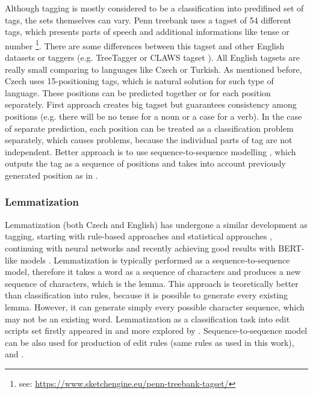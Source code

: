 Although tagging is mostly considered to be a classification into predifined set of tags, the sets themselves can vary. Penn treebank uses a tagset of 54 different tags, which presents parts of speech and additional informations like tense or number \footnote{see: \url{https://www.sketchengine.eu/penn-treebank-tagset/}}. There are some differences between this tagset and other English datasets or taggers (e.g. TreeTagger \citep{Schmid95improvementsin} or CLAWS tagset \citep{Chapelle1988TheCA}). All English tagsets are really small comparing to languages like Czech or Turkish. As mentioned before, Czech uses 15-positioning tags, which is  natural solution for such type of language. These positions can be predicted together or for each position separately. First approach creates big tagset but guarantees consistency among positions (e.g. there will be no tense for a noun or a case for a verb). In the case of separate prediction, each position can be treated as a classification problem separately, which causes problems, because the individual parts of tag are not independent. Better approach is to use sequence-to-sequence modelling \citep{Sutskever2014}, which outputs the tag as a sequence of positions and takes into account previously generated position as in \citep{malaviya-etal-2019-simple}.

\subsubsection{Lemmatization}
Lemmatization (both Czech and English) has undergone a similar development as tagging, starting with rule-based approaches and statistical approaches \citep{Plisson}, continuing with neural networks and recently achieving good results with BERT-like models \citep{Kondratyuk2019}.  Lemmatization is typically performed as a sequence-to-sequence model, therefore it takes a word as a sequence of characters and produces a new sequence of characters, which is the lemma. This approach is teoretically better than classification into rules, because it is possible to generate every existing lemma. However, it can generate simply every possible character sequence, which may not be an existing word. Lemmatization as a classification task into edit scripts set firstly appeared in \citep{Chrupala} and more explored by \citep{2018}. Sequence-to-sequence model can be also used for production of edit rules (same rules as used in this work)\citep{chakrabarty2017context}, \citep{muller2015joint} and \citep{Yildiz2019}.

